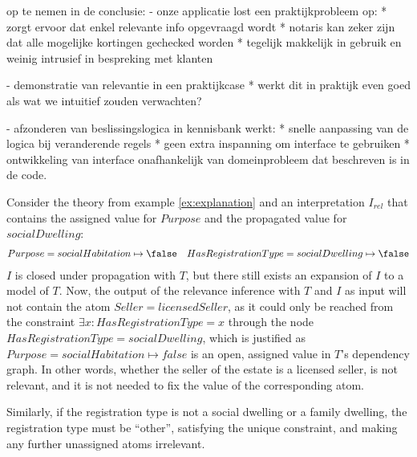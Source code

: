 

op te nemen in de conclusie:
- onze applicatie lost een praktijkprobleem op:
* zorgt ervoor dat enkel relevante info opgevraagd wordt
* notaris kan zeker zijn dat alle mogelijke kortingen gechecked worden
* tegelijk makkelijk in gebruik en weinig intrusief in bespreking met klanten

- demonstratie van relevantie in een praktijkcase
* werkt dit in praktijk even goed als wat we intuitief zouden verwachten?

- afzonderen van beslissingslogica in kennisbank werkt:
* snelle aanpassing van de logica bij veranderende regels
* geen extra inspanning om interface te gebruiken
* ontwikkeling van interface onafhankelijk van domeinprobleem dat beschreven is in de code.

\begin{example}
Consider the theory from example \ref{ex:explanation} and an  interpretation $I_{rel}$ that contains the assigned value for $Purpose$ and the propagated value for $socialDwelling$:
\begin{align*}
    &Purpose = socialHabitation \mapsto \false
    &HasRegistrationType=socialDwelling \mapsto \false
\end{align*}
$I$ is closed under propagation with $T$, but there still exists an expansion of $I$ to a model of $T$.
Now, the output of the relevance inference with $T$ and $I$ as input will not contain the atom $Seller=licensedSeller$, as it could only be reached from the constraint $\exists x \colon HasRegistrationType = x$ through the node $HasRegistrationType = socialDwelling$, which is justified as $Purpose = socialHabitation\mapsto false$ is an open, assigned value in $T$'s dependency graph.
In other words, whether the seller of the estate is a licensed seller, is not relevant, and it is not needed to fix the value of the corresponding atom.

Similarly, if the registration type is not a social dwelling or a family dwelling, the registration type must be ``other'', satisfying the unique constraint, and making any further unassigned atoms irrelevant.
\end{example}